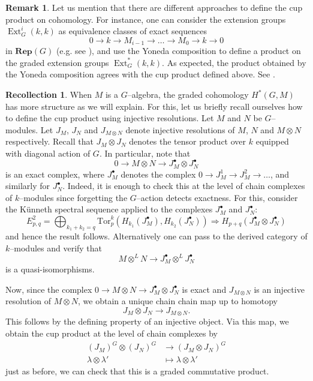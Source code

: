 \documentclass{article}
\theoremstyle{plain}
\theoremstyle{definition}
\newtheorem{Rem}[Th]{Remark}
\newtheorem{Rec}[Th]{Recollection}
\DeclareMathOperator{\Ext}{Ext}
\begin{document}
\begin{Rem}
Let us mention that there are different approaches to define the cup product on cohomology. For instance,  one can consider the extension groups $\Ext_G^i(k,k)$ as equivalence classes of exact sequences 
\[
0\to k\to M_{i-1} \to \ldots\to M_0 \to k\to 0
\]
in $\mathbf{Rep}(G)$  (e.g. see \cite[Section 2.6]{Ben}), and use  the Yoneda composition to define a product on the graded extension groups $\Ext^\ast_G(k,k)$. As expected, the product obtained by the Yoneda composition agrees with the cup product defined above. See \cite{suarez2004hilton}.     
\end{Rem}

\begin{Rec}
    When $M$ is a $G$--algebra, the graded cohomology $H^\ast(G,M)$ has more structure as we will explain. For this, let us briefly recall ourselves how to define the cup product using injective resolutions. Let $M$ and $N$ be $G$--modules. Let $J_M$, $J_N$ and $J_{M\otimes N}$ denote  injective resolutions of $M$, $N$ and $M\otimes N$ respectively. Recall that $J_M\otimes J_N$ denotes the tensor product over $k$ equipped with diagonal action of $G$. In particular, note that 
\[
0\to M\otimes N\to J_M^\bullet \otimes J_N^\bullet
\]
is an exact complex, where $J_M^\bullet$ denotes the complex $0\to J_M^{1}\to J^{2}_M\to \ldots$, and similarly for $J_N^\bullet$.  Indeed, it is enough to check this at the level of chain complexes of $k$--modules since forgetting the $G$--action detects exactness. For this, consider the K\"unneth spectral sequence applied to the complexes   $J_M^\bullet$ and $J_N^\bullet$:
\[
E_{p,q}^2 = \bigoplus_{k_1 + k_2 = q} \mathrm{Tor}_p^{k}( H_{k_1}(J_M^\bullet), H_{k_2}(J_N^\bullet)) \Rightarrow H_{p+q}(J_M^\bullet \otimes J_N^\bullet) 
\]
and hence the result follows. Alternatively one can pass to the derived category of $k$--modules and verify that 
\[
M\otimes^L N\to J_M^\bullet \otimes^L J_N^\bullet
\]
is a quasi-isomorphisms. 


Now, since the complex $0\to M\otimes N\to J_M^\bullet \otimes J_N^\bullet$ is exact and $J_{M\otimes N}$ is an injective resolution of $M\otimes N$, we obtain a unique chain chain map up to homotopy  
\[
J_M\otimes J_N\to J_{M\otimes N}.
\]
This follows by the defining property of an injective object. Via this map, we obtain the cup product at the level of chain complexes by
  \begin{align*}
     (J_M)^G\otimes (J_N)^G & \to (J_M\otimes J_N)^G\\ 
    \lambda\otimes\lambda' & \mapsto \lambda\otimes \lambda'
\end{align*}
 just as before, we can check that this is a graded commutative product. 
\end{Rec}
\end{document}
